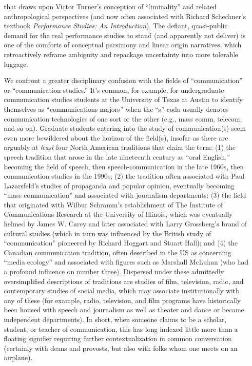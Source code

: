 \documentclass{tufte-handout}
\begin{document}

\noindent that draws upon Victor Turner's conception of ``liminality'' and related
anthropological perspectives (and now often associated with Richard
Schechner's textbook \emph{Performance Studies: An Introduction}). The
defiant, quasi-public demand for the real performance studies to stand
(and apparently not deliver) is one of the comforts of conceptual
parsimony and linear origin narratives, which retroactively reframe
ambiguity and repackage uncertainty into more tolerable luggage.

We confront a greater disciplinary confusion with the fields of
``communication'' or ``communication studies.'' It's common, for
example, for undergraduate communication studies students at the
University of Texas at Austin to identify themselves as ``communications
majors'' when the ``s'' coda usually denotes communication technologies
of one sort or the other (e.g., mass comm, telecom, and so on). Graduate
students entering into the study of communication(s) seem even more
bewildered about the horizon of the field(s), insofar as there are
arguably at \emph{least} four North American traditions that claim the
term: (1) the speech tradition that arose in the late nineteenth century
as ``oral English,'' becoming the field of speech, then
speech-communication in the late 1960s, then communication studies in
the 1990s; (2) the tradition often associated with Paul Lazarsfeld's
studies of propaganda and popular opinion, eventually becoming ``mass
communication'' and associated with journalism departments; (3) the
field that originated with Wilbur Schramm's establishment of The
Institute of Communications Research at the University of Illinois,
which was eventually helmed by James W. Carey and later associated with
Larry Grossberg's brand of cultural studies (which in turn was
influenced by the British study of ``communication'' pioneered by
Richard Hoggart and Stuart Hall); and (4) the Canadian communication
tradition, often described in the US as concerning ``media ecology'' and
associated with figures such as Marshall McLuhan (who had a profound
influence on number three). Dispersed under these admittedly
oversimplified descriptions of traditions are studies of film,
television, radio, and contemporary studies of social media, which may
associate institutionally with any of these (for example, radio,
television, and film programs have historically been housed with speech
and journalism as well as theater and dance or became independent
departments). In short, when someone claims to be a scholar, student, or
teacher of communication, this has long indexed little more than a
floating signifier requiring further contextualization in common
conversation (certainly with deans and provosts, but also with folks
whom one meets on an airplane).
\end{document}
